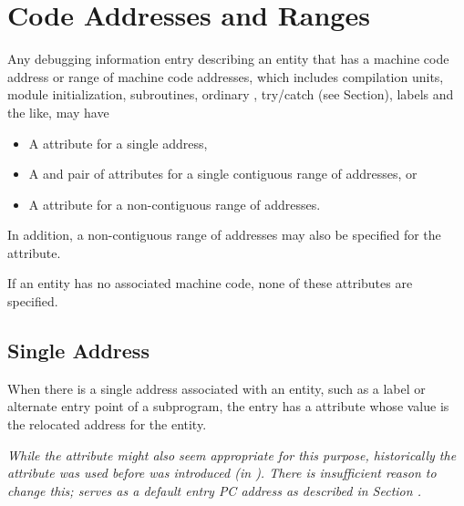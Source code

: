 \section{Code Addresses and Ranges}
\label{chap:codeaddressesandranges}
Any debugging information entry describing an entity that has
a machine code address or range of machine code addresses,
which includes compilation units, module initialization,
\hypertarget{chap:DWATrangesnoncontiguousrangeofcodeaddresses}{}
subroutines, ordinary , 
try/catch  (see Section), 
labels and the like, may have
\begin{itemize}
\item A \DWATlowpc{} attribute for
\hypertarget{chap:DWATlowpccodeaddressorrangeofaddresses}{}
a single address,

\item A \DWATlowpc{}
and 
\DWAThighpc{}
\hypertarget{chap:DWAThighpccontiguousrangeofcodeaddresses}{}
pair of attributes for 
a single contiguous range of
addresses, or

\item A \DWATranges{} attribute 
for a non-contiguous range of addresses.
\end{itemize}

In addition, a non-contiguous range of 
addresses may also be specified for the
\DWATstartscope{} attribute.

If an entity has no associated machine code, 
none of these attributes are specified.

\subsection{Single Address} 
When there is a single address associated with an entity,
such as a label or alternate entry point of a subprogram,
the entry has a \DWATlowpc{} attribute whose value is the
relocated address for the entity.

\textit{While the \DWATentrypc{}
attribute might also seem appropriate for this purpose,
historically the \DWATlowpc{} attribute was used before
\DWATentrypc{} was introduced 
(in ). There is
insufficient reason to change this;
\DWATlowpc{} serves as a default entry PC address as described
in Section .}

